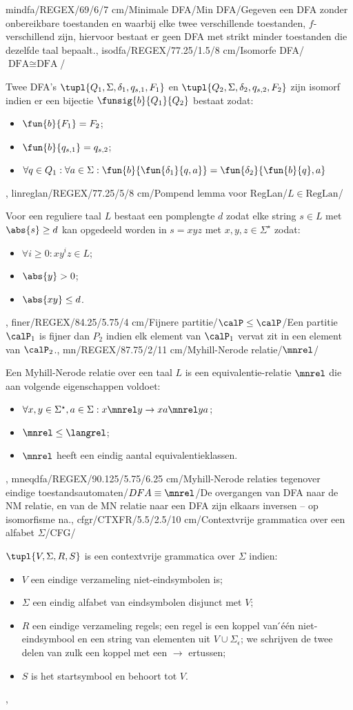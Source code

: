 mindfa/REGEX/69/6/7 cm/{Minimale DFA}/Min DFA/{Gegeven een DFA zonder onbereikbare toestanden en waarbij elke twee verschillende toestanden, $f$-verschillend zijn, hiervoor bestaat er geen DFA met strikt minder toestanden die dezelfde taal bepaalt.},
isodfa/REGEX/77.25/1.5/8 cm/Isomorfe DFA/{$\mbox{DFA}\cong\mbox{DFA}$}/{Twee DFA's $\tupl{Q_1,\Sigma,\delta_1,q_{s,1},F_1}$ en $\tupl{Q_2,\Sigma,\delta_2,q_{s,2},F_2}$ zijn isomorf indien er een bijectie $\funsig{b}{Q_1}{Q_2}$ bestaat zodat:\begin{itemize}\item $\fun{b}{F_1}=F_2$;\item $\fun{b}{q_{s,1}}=q_{s,2}$;\item $\forall q\in Q_1:\forall a\in\Sigma:\fun{b}{\fun{\delta_1}{q,a}}=\fun{\delta_2}{\fun{b}{q},a}$\end{itemize}},
linreglan/REGEX/77.25/5/8 cm/Pompend lemma voor RegLan/$L\in\mbox{RegLan}$/{Voor een reguliere taal $L$ bestaat een pomplengte $d$ zodat elke string $s\in L$ met $\abs{s}\geq d$ kan opgedeeld worden in $s=xyz$ met $x,y,z\in\Sigma^{\star}$ zodat:
\begin{itemize}
 \item $\forall i\geq 0:xy^iz\in L$;
 \item $\abs{y}>0$;
 \item $\abs{xy}\leq d$.
\end{itemize}},
finer/REGEX/84.25/5.75/4 cm/Fijnere partitie/{$\calP\leq\calP$}/{Een partitie $\calP_1$ is fijner dan $P_2$ indien elk element van $\calP_1$ vervat zit in een element van $\calP_2$.},
mn/REGEX/87.75/2/11 cm/Myhill-Nerode relatie/$\mnrel$/{Een Myhill-Nerode relatie over een taal $L$ is een equivalentie-relatie $\mnrel$ die aan volgende eigenschappen voldoet:\begin{itemize}\item $\forall x,y\in\Sigma^{\star},a\in\Sigma:x\mnrel y\rightarrow xa\mnrel ya$;\item $\mnrel\leq\langrel$;\item $\mnrel$ heeft een eindig aantal equivalentieklassen.\end{itemize}},
mneqdfa/REGEX/90.125/5.75/6.25 cm/Myhill-Nerode relaties tegenover eindige toestandsautomaten/$DFA\equiv\mnrel$/{De overgangen van DFA naar de NM relatie, en van de MN relatie naar een DFA zijn elkaars inversen -- op isomorfisme na.},
cfgr/CTXFR/5.5/2.5/10 cm/Contextvrije grammatica over een alfabet $\Sigma$/CFG/{$\tupl{V,\Sigma,R,S}$ is een contextvrije grammatica over $\Sigma$ indien:\begin{itemize}
 \item $V$ een eindige verzameling niet-eindsymbolen is;
 \item $\Sigma$ een eindig alfabet van eindsymbolen disjunct met $V$;
 \item $R$ een eindige verzameling regels; een regel is een koppel van  ́\'e\'en niet-eindsymbool en een string van elementen uit $V\cup\Sigma_{\epsilon}$; we schrijven de twee delen van zulk een koppel met een $\rightarrow$ ertussen;
 \item $S$ is het startsymbool en behoort tot $V$.
\end{itemize}},
